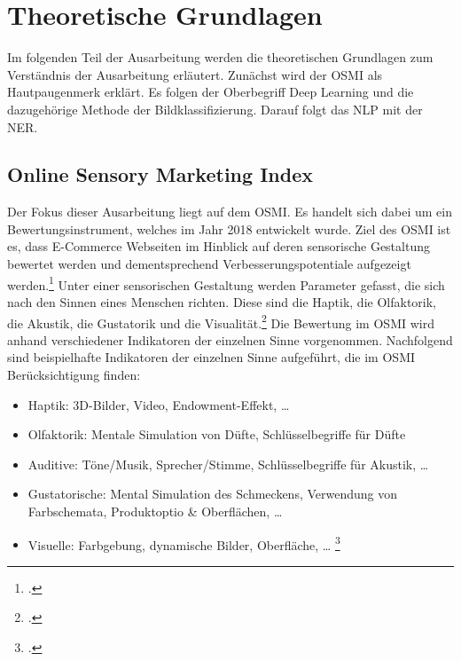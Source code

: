 \newpage
\section{Theoretische Grundlagen}
Im folgenden Teil der Ausarbeitung werden die theoretischen Grundlagen zum Verständnis der Ausarbeitung erläutert.
Zunächst wird der \ac{OSMI} als Hautpaugenmerk erklärt. Es folgen der Oberbegriff Deep Learning und die dazugehörige Methode der Bildklassifizierung.
Darauf folgt das \acl{NLP} mit der \acl{NER}.

\subsection{Online Sensory Marketing Index}

Der Fokus dieser Ausarbeitung liegt auf dem \acf{OSMI}. Es handelt sich dabei um ein Bewertungsinstrument, welches im Jahr 2018 entwickelt wurde.
Ziel des \ac{OSMI} ist es, dass E-Commerce Webseiten im Hinblick auf deren sensorische Gestaltung bewertet werden und dementsprechend Verbesserungspotentiale aufgezeigt werden.\footcite[\vglf][]{hamacher2018}
Unter einer sensorischen Gestaltung werden Parameter gefasst, die sich nach den Sinnen eines Menschen richten. Diese sind die Haptik, die Olfaktorik, die Akustik, die Gustatorik und die Visualität.\footcite[\vglf][ \& 862]{zou2018}
Die Bewertung im \ac{OSMI} wird anhand verschiedener Indikatoren der einzelnen Sinne vorgenommen. Nachfolgend sind beispielhafte Indikatoren der einzelnen Sinne aufgeführt, die im \ac{OSMI} Berücksichtigung finden:

\begin{itemize}
    \item Haptik: 3D-Bilder, Video, Endowment-Effekt, …
    \item Olfaktorik: Mentale Simulation von Düfte, Schlüsselbegriffe für Düfte
    \item Auditive: Töne/Musik, Sprecher/Stimme, Schlüsselbegriffe für Akustik, …
    \item Gustatorische: Mental Simulation des Schmeckens, Verwendung von
    Farbschemata, Produktoptio \& Oberflächen, …
    \item Visuelle: Farbgebung, dynamische Bilder, Oberfläche, … \footcite[\vglf][-56]{hamacher2018}
\end{itemize}

